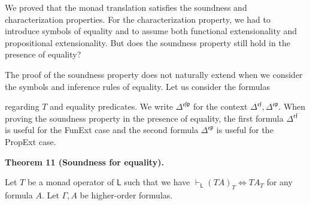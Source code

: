\documentclass[10pt,a4paper]{article}
\begin{document}
 
 
We proved that the monad translation satisfies the soundness and characterization properties. For the characterization property, we had to introduce symbols of equality and to assume both functional extensionality and propositional extensionality. But does the soundness property still hold in the presence of equality?\par
 
 
 
The proof of the soundness property does not naturally extend when we consider the symbols and inference rules of equality. Let us consider the formulas\par
 
\begin{center}\end{center}
 
regarding $T$ and equality predicates. We write $\Delta^{\mathfrak{e}\mathfrak{f}\mathfrak{p}}$ for the context $\Delta^{\mathfrak{e}\mathfrak{f}},\Delta^{\mathfrak{e}\mathfrak{p}}$. When proving the soundness property in the presence of equality, the first formula $\Delta^{\mathfrak{e}\mathfrak{f}}$ is useful for the FunExt case and the second formula $\Delta^{\mathfrak{e}\mathfrak{p}}$ is useful for the PropExt case.\par
 
 

 
\par\medskip\noindent\textbf{Theorem 11 (Soundness for equality).}\par
 
 
Let $T$ be a monad operator of $\mathsf{L}$ such that we have $\vdash_{\mathsf{L}}(TA)_{T}\Leftrightarrow TA_{T}$ for any formula $A$. Let $\Gamma,A$ be higher-order formulas.\par
  
\end{document}
